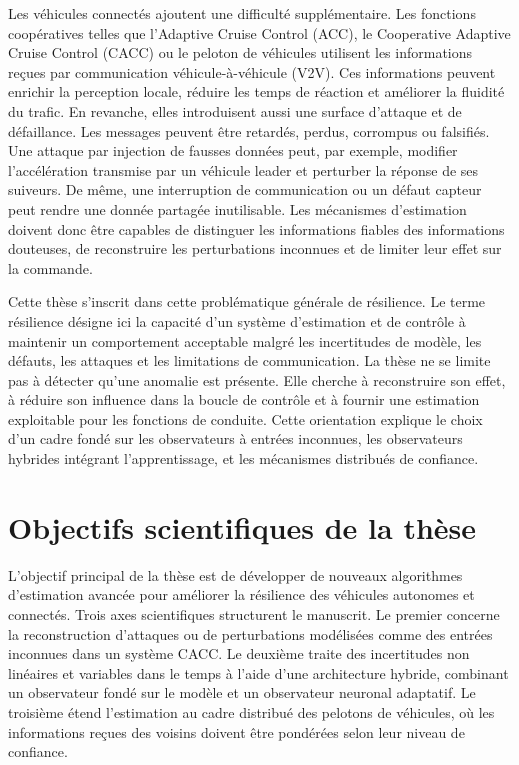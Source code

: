 Les véhicules connectés ajoutent une difficulté supplémentaire. Les fonctions coopératives telles que l'Adaptive Cruise Control (ACC), le Cooperative Adaptive Cruise Control (CACC) ou le peloton de véhicules utilisent les informations reçues par communication véhicule-à-véhicule (V2V). Ces informations peuvent enrichir la perception locale, réduire les temps de réaction et améliorer la fluidité du trafic. En revanche, elles introduisent aussi une surface d'attaque et de défaillance. Les messages peuvent être retardés, perdus, corrompus ou falsifiés. Une attaque par injection de fausses données peut, par exemple, modifier l'accélération transmise par un véhicule leader et perturber la réponse de ses suiveurs. De même, une interruption de communication ou un défaut capteur peut rendre une donnée partagée inutilisable. Les mécanismes d'estimation doivent donc être capables de distinguer les informations fiables des informations douteuses, de reconstruire les perturbations inconnues et de limiter leur effet sur la commande.

Cette thèse s'inscrit dans cette problématique générale de résilience. Le terme résilience désigne ici la capacité d'un système d'estimation et de contrôle à maintenir un comportement acceptable malgré les incertitudes de modèle, les défauts, les attaques et les limitations de communication. La thèse ne se limite pas à détecter qu'une anomalie est présente. Elle cherche à reconstruire son effet, à réduire son influence dans la boucle de contrôle et à fournir une estimation exploitable pour les fonctions de conduite. Cette orientation explique le choix d'un cadre fondé sur les observateurs à entrées inconnues, les observateurs hybrides intégrant l'apprentissage, et les mécanismes distribués de confiance.

\section*{Objectifs scientifiques de la thèse}

L'objectif principal de la thèse est de développer de nouveaux algorithmes d'estimation avancée pour améliorer la résilience des véhicules autonomes et connectés. Trois axes scientifiques structurent le manuscrit. Le premier concerne la reconstruction d'attaques ou de perturbations modélisées comme des entrées inconnues dans un système CACC. Le deuxième traite des incertitudes non linéaires et variables dans le temps à l'aide d'une architecture hybride, combinant un observateur fondé sur le modèle et un observateur neuronal adaptatif. Le troisième étend l'estimation au cadre distribué des pelotons de véhicules, où les informations reçues des voisins doivent être pondérées selon leur niveau de confiance.


